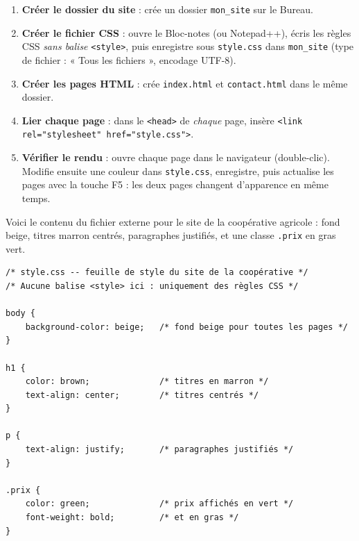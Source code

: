 \documentclass[11pt]{article}
\begin{document}
\begin{methode}
\begin{enumerate}
  \item \textbf{Créer le dossier du site} : crée un dossier \texttt{mon\_site} sur le Bureau.
  \item \textbf{Créer le fichier CSS} : ouvre le Bloc-notes (ou Notepad++), écris les règles CSS \emph{sans balise} \texttt{<style>}, puis enregistre sous \texttt{style.css} dans \texttt{mon\_site} (type de fichier : « Tous les fichiers », encodage UTF-8).
  \item \textbf{Créer les pages HTML} : crée \texttt{index.html} et \texttt{contact.html} dans le même dossier.
  \item \textbf{Lier chaque page} : dans le \texttt{<head>} de \emph{chaque} page, insère \texttt{<link rel="stylesheet" href="style.css">}.
  \item \textbf{Vérifier le rendu} : ouvre chaque page dans le navigateur (double-clic). Modifie ensuite une couleur dans \texttt{style.css}, enregistre, puis actualise les pages avec la touche F5 : les deux pages changent d'apparence en même temps.
\end{enumerate}
\end{methode}

\begin{exemplebox}
Voici le contenu du fichier externe pour le site de la coopérative agricole : fond beige, titres marron centrés, paragraphes justifiés, et une classe \texttt{.prix} en gras vert.
\begin{lstlisting}
/* style.css -- feuille de style du site de la coopérative */
/* Aucune balise <style> ici : uniquement des règles CSS */

body {
    background-color: beige;   /* fond beige pour toutes les pages */
}

h1 {
    color: brown;              /* titres en marron */
    text-align: center;        /* titres centrés */
}

p {
    text-align: justify;       /* paragraphes justifiés */
}

.prix {
    color: green;              /* prix affichés en vert */
    font-weight: bold;         /* et en gras */
}
\end{lstlisting}
\end{exemplebox}
\end{document}
